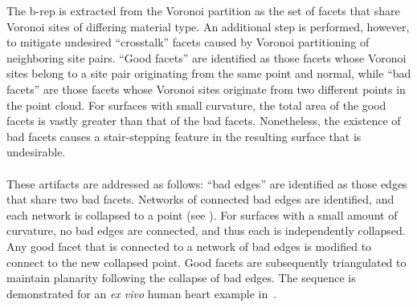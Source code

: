 The b-rep is extracted from the Voronoi partition as the set of facets that share Voronoi sites of differing material type. An additional step is performed, however, to mitigate undesired ``crosstalk'' facets caused by Voronoi partitioning of neighboring site pairs. ``Good facets'' are identified as those facets whose Voronoi sites belong to a site pair originating from the same point and normal, while ``bad facets'' are those facets whose Voronoi sites originate from two different points in the point cloud. For surfaces with small curvature, the total area of the good facets is vastly greater than that of the bad facets. Nonetheless, the existence of bad facets causes a stair-stepping feature in the resulting surface that is undesirable. \\ \\
%
These artifacts are addressed as follows: ``bad edges'' are identified as those edges that share two bad facets. Networks of connected bad edges are identified, and each network is collapsed to a point (see ). For surfaces with a small amount of curvature, no bad edges are connected, and thus each is independently collapsed. Any good facet that is connected to a network of bad edges is modified to connect to the new collapsed point. Good facets are subsequently triangulated to maintain planarity following the collapse of bad edges. The sequence is demonstrated for an \textit{ex vivo} human heart example in~. \\

